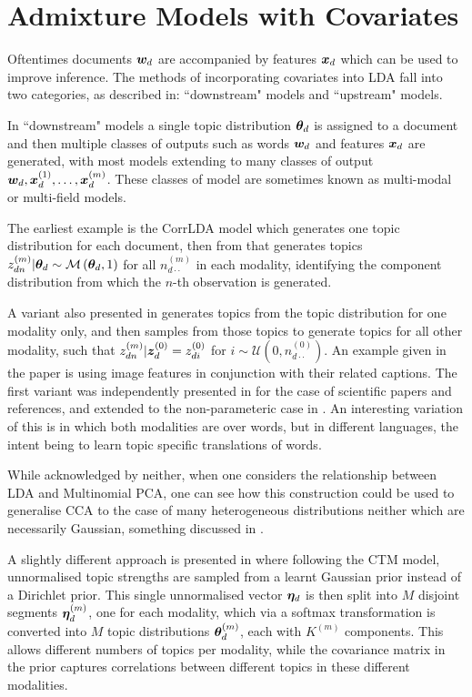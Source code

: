 
\section{Admixture Models with Covariates}
Oftentimes documents $\bm w_d$ are accompanied by features $\bm x_d$ which can be used to improve inference. The methods of incorporating covariates into LDA fall into two categories, as described in\cite{Mimno2008}: ``downstream" models and ``upstream" models.

In ``downstream" models a single topic distribution ${ \bm \theta_d }$ is assigned to a document and then multiple classes of outputs such as words $\bm w_d$ and features $\bm x_d$ are generated, with most models extending to many classes of output $\bm w_d, \bm x_d^{(1)}, \ldots, \bm x_d^{(m)}$. These classes of model are sometimes known as multi-modal\cite{Virtanen2012a} or multi-field\cite{Salomatin2009} models.

The earliest example is the CorrLDA model\cite{Blei2003} which generates one topic distribution for each document, then from that generates topics $z_{dn}^{(m)}|{ \bm \theta_d } \sim \mathcal{M} \left( {{ \bm \theta_d }},{1} \right)$ for all $n_{d\cdot\cdot}^{(m)}$ in each modality, identifying the component distribution from which the $n$-th observation is generated.

A variant also presented in\cite{Blei2003} generates topics from the topic distribution for one modality only, and then samples from those topics to generate topics for all other modality, such that $z_{dn}^{(m)}|\bm z_d^{(0)} = z_{di}^{(0)}$ for $i \sim \mathcal{U}(0, n_{d\cdot\cdot}^{(0)})$. An example given in the paper is using image features in conjunction with their related captions. The first variant was independently presented in \cite{Erosheva2004} for the case of scientific papers and references, and extended to the non-parameteric case in \cite{Yakhnenko2009}. An interesting variation of this is \cite{Zhao2001} in which both modalities are over words, but in different languages, the intent being to learn topic specific translations of words.

While acknowledged by neither, when one considers the relationship between LDA and Multinomial PCA\cite{Buntine2002}, one can see how this construction could be used to generalise CCA to the case of many heterogeneous distributions neither which are necessarily Gaussian, something discussed in \cite{Virtanen2012a}. 

A slightly different approach is presented in \cite{Salomatin2009} where following the CTM model\cite{Blei2006}, unnormalised topic strengths are sampled from a learnt Gaussian prior instead of a Dirichlet prior. This single unnormalised vector $\bm \eta_d$ is then split into $M$ disjoint segments $\bm \eta_d^{(m)}$, one for each modality, which via a softmax transformation is converted into $M$ topic distributions $\bm \theta_d^{(m)}$, each with $K^{(m)}$ components. This allows different numbers of topics per modality, while the covariance matrix in the prior captures correlations between different topics in these different modalities.


